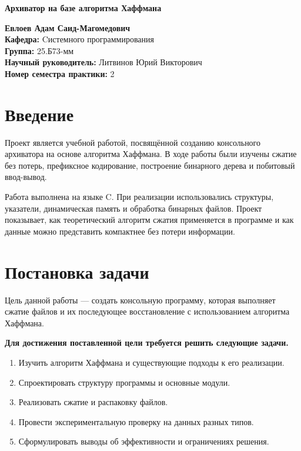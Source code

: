 \documentclass[14pt,a4paper]{extarticle}
\begin{document}
\begin{center}
    \textbf{\Large Архиватор на базе алгоритма Хаффмана}
\end{center}

\vspace{1cm}

\noindent
\textbf{Евлоев Адам Саид-Магомедович} \\ 
\textbf {Кафедра:} {Cистемного программирования} \\
\textbf{Группа:} 25.Б73-мм \\ 
\textbf{Научный руководитель:} Литвинов Юрий Викторович \\ 
\textbf{Номер семестра практики:} 2 \\

\vspace{1cm}

\section{Введение}

Проект является учебной работой, посвящённой созданию консольного архиватора на основе алгоритма Хаффмана. В ходе работы были изучены сжатие без потерь, префиксное кодирование, построение бинарного дерева и побитовый ввод-вывод.

Работа выполнена на языке C. При реализации использовались структуры, указатели, динамическая память и обработка бинарных файлов. Проект показывает, как теоретический алгоритм сжатия применяется в программе и как данные можно представить компактнее без потери информации.

\section{Постановка задачи}

Цель данной работы --- создать консольную программу, которая выполняет сжатие файлов и их последующее восстановление с использованием алгоритма Хаффмана.

\textbf{Для достижения поставленной цели требуется решить следующие задачи.}

\begin{enumerate}
    \item Изучить алгоритм Хаффмана и существующие подходы к его реализации.
    \item Спроектировать структуру программы и основные модули.
    \item Реализовать сжатие и распаковку файлов.
    \item Провести экспериментальную проверку на данных разных типов.
    \item Сформулировать выводы об эффективности и ограничениях решения.
\end{enumerate}
\end{document}
